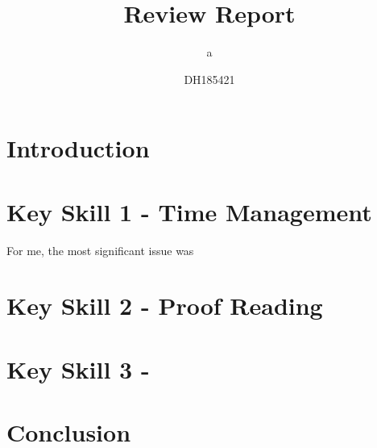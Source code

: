 \documentclass{scrartcl}
\title{Review Report}
\subtitle{a}
\author{DH185421}
\begin{document}
\maketitle


\section{Introduction}



\section{Key Skill 1 - Time Management}

For me, the most significant issue was
\section{Key Skill 2 - Proof Reading}

\section{Key Skill 3 - }

\section{Conclusion}
\end{document}
